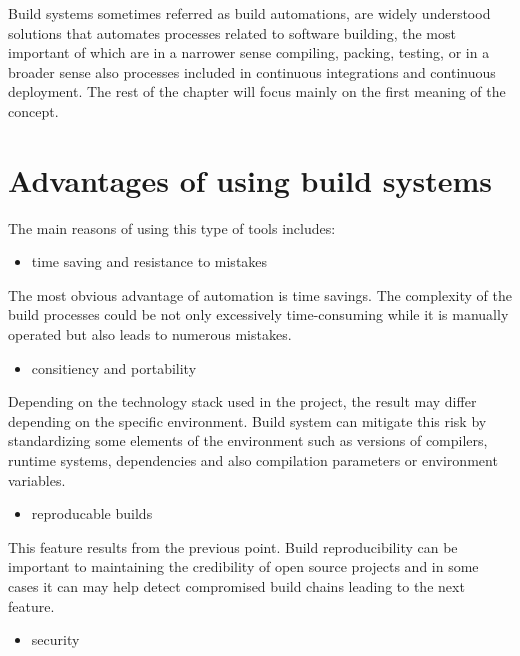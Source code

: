 Build systems sometimes referred as build automations, are widely
understood solutions that automates processes related to software
building, the most important of which are in a narrower sense compiling,
packing, testing, or in a broader sense also processes included in
continuous integrations and continuous deployment. The rest of the
chapter will focus mainly on the first meaning of the concept.

\hypertarget{advantages-of-using-build-systems}{%
\section{Advantages of using build
systems}\label{advantages-of-using-build-systems}}

The main reasons of using this type of tools includes:

\begin{itemize}
\item
  time saving and resistance to mistakes
\end{itemize}

The most obvious advantage of automation is time savings. The complexity
of the build processes could be not only excessively time-consuming
while it is manually operated but also leads to numerous mistakes.

\begin{itemize}
\item
  consitiency and portability
\end{itemize}

Depending on the technology stack used in the project, the result may
differ depending on the specific environment. Build system can mitigate
this risk by standardizing some elements of the environment such as
versions of compilers, runtime systems, dependencies and also
compilation parameters or environment variables.

\begin{itemize}
\item
  reproducable builds
\end{itemize}

This feature results from the previous point. Build reproducibility can
be important to maintaining the credibility of open source projects and
in some cases it can may help detect compromised build chains leading to
the next feature.

\begin{itemize}
\item
  security
\end{itemize}

